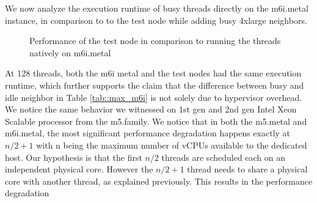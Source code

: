 We now analyze the execution runtime of busy threads directly on the m6i.metal instance, in comparison
to to the test node while adding busy 4xlarge neighbors. 
\begin{figure}[H]
\caption{Performance of the test node in comparison to running the threads natively on m6i.metal}
\end{figure}
\noindent
At 128 threads, both the m6i metal and the 
test nodes had the same execution runtime, which further supports the claim that the difference between 
busy and idle neighbor in Table \ref{tab::max_m6i} is not solely due to hypervisor overhead.  
We notice the same behavior we witnessed on 1st gen and 2nd gen Intel Xeon Scalable processor from the 
m5.family. We notice that in both the m5.metal and m6i.metal, the most significant performance degradation 
happens exactly at    \begin{math}n / 2 + 1\end{math} with n being the maximum number of vCPUs available 
to the dedicated host. Our hypothesis is that the first \begin{math}n/2\end{math} threads are scheduled 
each on an independent physical core. However the \begin{math}n / 2 + 1\end{math} thread needs to share 
a physical core with another thread, as explained previously. This results in the performance degradation 
